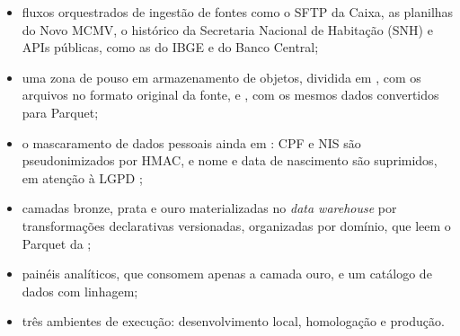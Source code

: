 \begin{itemize}
	\item fluxos orquestrados de ingestão de fontes como o SFTP da Caixa, as planilhas do Novo MCMV, o histórico da Secretaria Nacional de Habitação (SNH) e APIs públicas, como as do IBGE e do Banco Central;
	\item uma zona de pouso em armazenamento de objetos, dividida em , com os arquivos no formato original da fonte, e , com os mesmos dados convertidos para Parquet;
	\item o mascaramento de dados pessoais ainda em : CPF e NIS são pseudonimizados por HMAC, e nome e data de nascimento são suprimidos, em atenção à LGPD \cite{brasil2018lgpd};
	\item camadas bronze, prata e ouro materializadas no \textit{data warehouse} por transformações declarativas versionadas, organizadas por domínio, que leem o Parquet da ;
	\item painéis analíticos, que consomem apenas a camada ouro, e um catálogo de dados com linhagem;
	\item três ambientes de execução: desenvolvimento local, homologação e produção.
\end{itemize}

